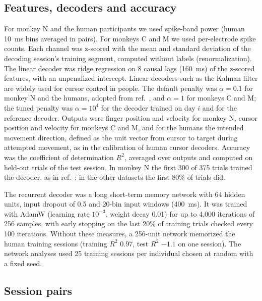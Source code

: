 \documentclass[pdflatex,sn-nature]{sn-jnl}
\begin{document}
\subsection*{Features, decoders and accuracy}

For monkey N and the human participants we used spike-band power (human 10~ms bins averaged in pairs). For monkeys C and
M we used per-electrode spike counts. Each channel was z-scored with the mean and standard deviation of the decoding
session's training segment, computed without labels (renormalization). The linear decoder was ridge
regression\cite{hoerl1970} on 8 causal lags (160~ms) of the z-scored features, with an unpenalized intercept. Linear
decoders such as the Kalman filter are widely used for cursor control in people\cite{kim2008,malik2011}. The default
penalty was $\alpha = 0.1$ for monkey N and the humans, adopted from ref.~\cite{temmar2025}, and $\alpha = 1$ for monkeys C
and M; the tuned penalty was $\alpha = 10^4$ for the decoder trained on day $i$ and for the reference decoder. Outputs were
finger position and velocity for monkey N, cursor position and velocity for monkeys C and M, and for the humans the
intended movement direction, defined as the unit vector from cursor to target during attempted movement, as in the
calibration of human cursor decoders\cite{kim2008,jarosiewicz2013}. Accuracy was
the coefficient of determination $R^2$, averaged over outputs and computed on held-out trials of the test session. In
monkey N the first 300 of 375 trials trained the decoder, as in ref.~\cite{temmar2025}; in the other datasets the first
80\% of trials did.

The recurrent decoder was a long short-term memory network\cite{hochreiter1997} with 64 hidden units, input
dropout\cite{srivastava2014} of 0.5 and 20-bin input windows (400~ms). It was trained with AdamW\cite{loshchilov2019}
(learning rate $10^{-3}$, weight decay 0.01) for up to 4,000 iterations of 256 samples, with early stopping on the last
20\% of training trials checked every 100 iterations. Without these measures, a 256-unit network memorized the human
training sessions (training $R^2$ 0.97, test $R^2$ $-1.1$ on one session). The network analyses used 25 training
sessions per individual chosen at random with a fixed seed.

\subsection*{Session pairs}
\end{document}
